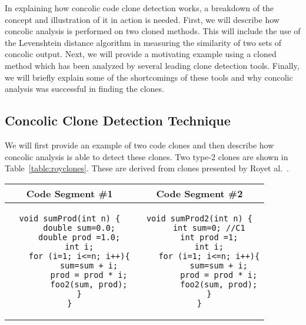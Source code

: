 \documentclass[smallextended]{svjour3}       %
\begin{document}
In explaining how concolic code clone detection works, a breakdown of the concept and illustration of it in action is needed. First, we will describe how concolic analysis is performed on two cloned methods. This will include the use of the Levenshtein distance algorithm in measuring the similarity of two sets of concolic output. Next, we will provide a motivating example using a cloned method which has been analyzed by several leading clone detection tools. Finally, we will briefly explain some of the shortcomings of these tools and why concolic analysis was successful in finding the clones.

\subsection{Concolic Clone Detection Technique}
We will first provide an example of two code clones and then describe how concolic analysis is able to detect these clones. Two type-2 clones are shown in Table~\ref{table:royclones}. These are derived from clones presented by Royet al.~\cite{Roy:2009:CEC:1530898.1531101}.


\noindent
\begin{table*}
\centering
\begin{tabular}{c | c}
\bfseries Code Segment \#1  & \bfseries Code Segment \#2 \\ \hline \hline
\begin{lstlisting}
void sumProd(int n) {
	double sum=0.0;
	double prod =1.0;
	int i;
	for (i=1; i<=n; i++){
		sum=sum + i;
		prod = prod * i;
		foo2(sum, prod);
	}
}
\end{lstlisting}
&
\begin{lstlisting}
void sumProd2(int n) {
	int sum=0; //C1
	int prod =1;
	int i;
	for (i=1; i<=n; i++){
		sum=sum + i;
		prod = prod * i;
		foo2(sum, prod);
	}
}
\end{lstlisting}

\end{tabular}
\caption{An Example of Type-2 clones from Roy~\label{table:royclones}}
\end{table*}
\end{document}
